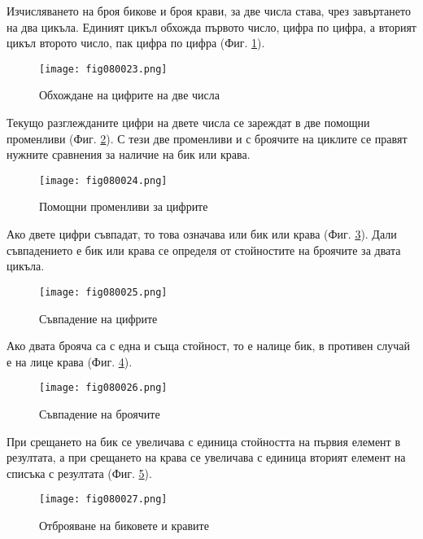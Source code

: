 Изчисляването на броя бикове и броя крави, за две числа става, чрез завъртането на два цикъла. Единият цикъл обхожда първото число, цифра по цифра, а вторият цикъл второто число, пак цифра по цифра (Фиг. \ref{fig080023}).

\begin{figure}[H]
  \centering
  \texttt{[image: fig080023.png]}
  \caption{Обхождане на цифрите на две числа}
\label{fig080023}
\end{figure}

Текущо разглежданите цифри на двете числа се зареждат в две помощни променливи (Фиг. \ref{fig080024}). С тези две променливи и с броячите на циклите се правят нужните сравнения за наличие на бик или крава. 

\begin{figure}[H]
  \centering
  \texttt{[image: fig080024.png]}
  \caption{Помощни променливи за цифрите}
\label{fig080024}
\end{figure}

Ако двете цифри съвпадат, то това означава или бик или крава (Фиг. \ref{fig080025}). Дали съвпадението е бик или крава се определя от стойностите на броячите за двата цикъла.

\begin{figure}[H]
  \centering
  \texttt{[image: fig080025.png]}
  \caption{Съвпадение на цифрите}
\label{fig080025}
\end{figure}

Ако двата брояча са с една и съща стойност, то е налице бик, в противен случай е на лице крава (Фиг. \ref{fig080026}).

\begin{figure}[H]
  \centering
  \texttt{[image: fig080026.png]}
  \caption{Съвпадение на броячите}
\label{fig080026}
\end{figure}

При срещането на бик се увеличава с единица стойността на първия елемент в резултата, а при срещането на крава се увеличава с единица вторият елемент на списъка с резултата (Фиг. \ref{fig080027}).

\begin{figure}[H]
  \centering
  \texttt{[image: fig080027.png]}
  \caption{Отброяване на биковете и кравите}
\label{fig080027}
\end{figure}

